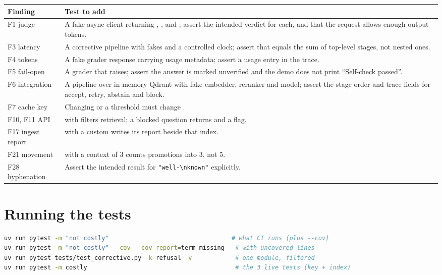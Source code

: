 \begin{recommended}
\begin{center}\small
\begin{tabularx}{\textwidth}{@{}>{\raggedright\arraybackslash}p{2.5cm}L@{}}
\toprule
\textbf{Finding} & \textbf{Test to add}\\
\midrule
F1 judge & A fake async client returning , ,  and ; assert the intended verdict for each, and that the request allows enough output tokens.\\
F3 latency & A corrective pipeline with fakes and a controlled clock; assert that  equals the sum of top-level stages, not nested ones.\\
F4 tokens & A fake grader response carrying usage metadata; assert a  usage entry in the trace.\\
F5 fail-open & A grader that raises; assert the answer is marked unverified and the demo does not print \enquote{Self-check passed}.\\
F6 integration & A  pipeline over in-memory Qdrant with fake embedder, reranker and model; assert the stage order and trace fields for accept, retry, abstain and block.\\
F7 cache key & Changing  or a threshold must change .\\
F10, F11 API &  with  filters retrieval; a blocked question returns  and a  flag.\\
F17 ingest report &  with a custom  writes its report beside that index.\\
F21 movement &  with a context of 3 counts promotions into 3, not 5.\\
F28 hyphenation & Assert the intended result for \texttt{"well-\textbackslash nknown"} explicitly.\\
\bottomrule
\end{tabularx}
\end{center}
\end{recommended}

\section{Running the tests}

\begin{lstlisting}[language=bash]
uv run pytest -m "not costly"                                  # what CI runs (plus --cov)
uv run pytest -m "not costly" --cov --cov-report=term-missing   # with uncovered lines
uv run pytest tests/test_corrective.py -k refusal -v            # one module, filtered
uv run pytest -m costly                                         # the 3 live tests (key + index)
\end{lstlisting}
